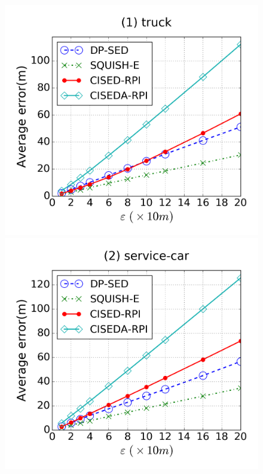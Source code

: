 {\begin{figure}[tb]
\centering
\includegraphics[scale = 0.250]{figures/Exp-error-epsilon-truck.png}
\includegraphics[scale = 0.250]{figures/Exp-error-epsilon-service.png}

\end{figure}}
